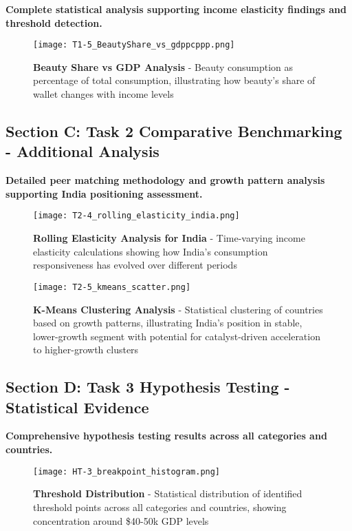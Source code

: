 \documentclass[11pt]{article}
\begin{document}
\textbf{Complete statistical analysis supporting income elasticity findings and threshold detection.}



\begin{figure}[H]
\centering
\texttt{[image: T1-5\_BeautyShare\_vs\_gdppcppp.png]}
\caption{\textbf{Beauty Share vs GDP Analysis} - Beauty consumption as percentage of total consumption, illustrating how beauty's share of wallet changes with income levels}
\end{figure}


\subsection*{Section C: Task 2 Comparative Benchmarking - Additional Analysis}

\textbf{Detailed peer matching methodology and growth pattern analysis supporting India positioning assessment.}


\begin{figure}[H]
\centering
\texttt{[image: T2-4\_rolling\_elasticity\_india.png]}
\caption{\textbf{Rolling Elasticity Analysis for India} - Time-varying income elasticity calculations showing how India's consumption responsiveness has evolved over different periods}
\end{figure}

\begin{figure}[H]
\centering
\texttt{[image: T2-5\_kmeans\_scatter.png]}
\caption{\textbf{K-Means Clustering Analysis} - Statistical clustering of countries based on growth patterns, illustrating India's position in stable, lower-growth segment with potential for catalyst-driven acceleration to higher-growth clusters}
\end{figure}

\subsection*{Section D: Task 3 Hypothesis Testing - Statistical Evidence}

\textbf{Comprehensive hypothesis testing results across all categories and countries.}

\begin{figure}[H]
\centering
\texttt{[image: HT-3\_breakpoint\_histogram.png]}
\caption{\textbf{Threshold Distribution} - Statistical distribution of identified threshold points across all categories and countries, showing concentration around \$40-50k GDP levels}
\end{figure}
\end{document}

